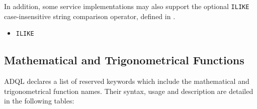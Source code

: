 \documentclass[11pt,a4paper]{ivoa}
\begin{document}
In addition, some service implementations may also support the optional \verb:ILIKE:
case-insensitive string comparison operator, defined in .

\begin{itemize}
    \item \verb:ILIKE:
\end{itemize}

\clearpage
\subsection{Mathematical and Trigonometrical Functions}
\label{sec:math.functions}

ADQL declares a list of reserved keywords  which include
the mathematical and trigonometrical function names. Their syntax,
usage and description are detailed in the following tables:
\end{document}
